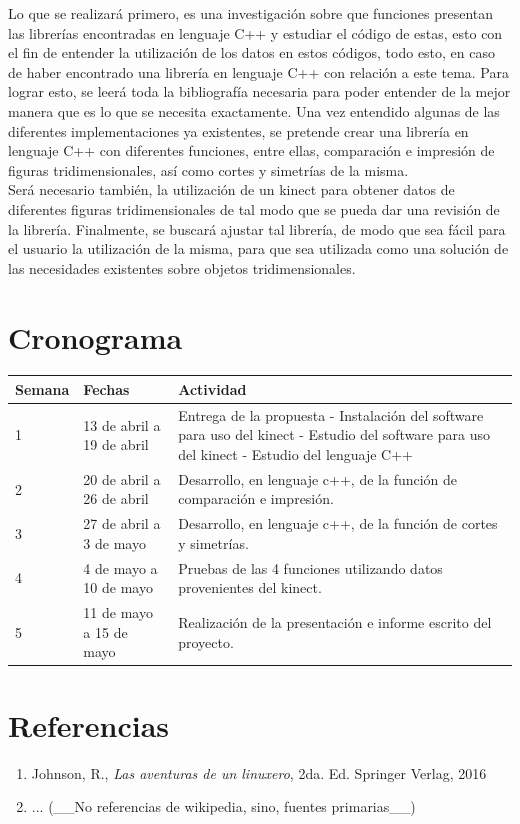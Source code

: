 \documentclass[letterpaper]{article}
\begin{document}
Lo que se realizará primero, es una investigación sobre que funciones presentan las librerías encontradas en lenguaje C++ y estudiar el código de estas,
esto con el fin de entender la utilización de los datos en estos códigos, todo esto, en caso de haber encontrado una librería en lenguaje C++ con relación a este tema.
Para lograr esto, se leerá toda la bibliografía necesaria para poder entender de la mejor manera que es lo que se necesita exactamente. Una vez
entendido algunas de las diferentes implementaciones ya existentes, se pretende crear una librería en lenguaje C++ con diferentes funciones, entre ellas,
comparación e impresión de figuras tridimensionales, así como cortes y simetrías de la misma. \\

Será necesario también, la utilización de un
kinect para obtener datos de diferentes figuras tridimensionales de tal modo que se pueda dar una revisión de la librería. Finalmente, se buscará ajustar tal librería,
de modo que sea fácil para el usuario la utilización de la misma, para que sea utilizada como una solución de las necesidades
existentes sobre objetos tridimensionales.\\




\section{Cronograma}

\begin{table}[H]
\begin{tabular}{l l l}
\toprule
\textbf{Semana} & \textbf{Fechas} & \textbf{Actividad}\\
\midrule
1 & 13 de abril a 19 de abril & Entrega de la propuesta - Instalación del
software para uso del kinect -
 Estudio del software para uso del kinect -
Estudio del lenguaje C++ \\
2 & 20 de abril a 26 de abril & Desarrollo, en lenguaje c++, de la función
de comparación e impresión. \\
3 & 27 de abril a 3 de mayo & Desarrollo, en lenguaje c++, de la función
de cortes y simetrías. \\
4 & 4 de mayo a 10 de mayo & Pruebas de las 4 funciones utilizando datos
provenientes del kinect. \\
5 & 11 de mayo a 15 de mayo & Realización de la presentación e informe
escrito del proyecto. \\
\bottomrule
\end{tabular}
\end{table}

\section{Referencias}

\begin{enumerate}
\item Johnson, R., \textit{Las aventuras de un linuxero}, 2da. Ed. Springer Verlag, 2016
\item ... (\_\_No referencias de wikipedia, sino, fuentes primarias\_\_)
\end{enumerate}
	
\end{document}
